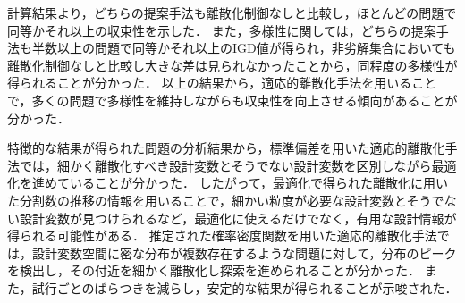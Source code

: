 \documentclass[../main/main]{subfiles}
\begin{document}
計算結果より，どちらの提案手法も離散化制御なしと比較し，ほとんどの問題で同等かそれ以上の収束性を示した．
また，多様性に関しては，どちらの提案手法も半数以上の問題で同等かそれ以上のIGD値が得られ，非劣解集合においても離散化制御なしと比較し大きな差は見られなかったことから，同程度の多様性が得られることが分かった．
以上の結果から，適応的離散化手法を用いることで，多くの問題で多様性を維持しながらも収束性を向上させる傾向があることが分かった．

特徴的な結果が得られた問題の分析結果から，標準偏差を用いた適応的離散化手法では，細かく離散化すべき設計変数とそうでない設計変数を区別しながら最適化を進めていることが分かった．
したがって，最適化で得られた離散化に用いた分割数の推移の情報を用いることで，細かい粒度が必要な設計変数とそうでない設計変数が見つけられるなど，最適化に使えるだけでなく，有用な設計情報が得られる可能性がある．
推定された確率密度関数を用いた適応的離散化手法では，設計変数空間に密な分布が複数存在するような問題に対して，分布のピークを検出し，その付近を細かく離散化し探索を進められることが分かった．
また，試行ごとのばらつきを減らし，安定的な結果が得られることが示唆された．

\end{document}
